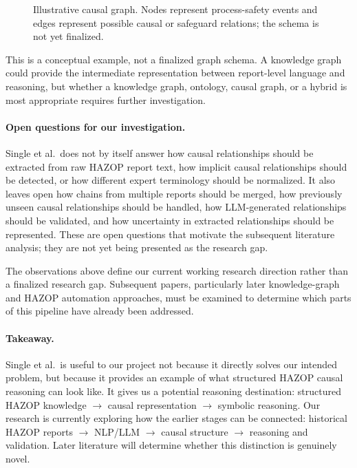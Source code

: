 \begin{figure}[htbp]
\centering
{}%
\caption[Conceptual causal graph for HAZOP reasoning]{Illustrative causal
graph. Nodes represent process-safety events and edges represent possible
causal or safeguard relations; the schema is not yet finalized.}
\label{fig:w2-conceptual-graph}
\end{figure}

This is a conceptual example, not a finalized graph schema. A knowledge graph
could provide the intermediate representation between report-level language
and reasoning, but whether a knowledge graph, ontology, causal graph, or a
hybrid is most appropriate requires further investigation.

\paragraph{Open questions for our investigation.}
Single et al.\ does not by itself answer how causal relationships should be
extracted from raw HAZOP report text, how implicit causal relationships should
be detected, or how different expert terminology should be normalized. It
also leaves open how chains from multiple reports should be merged, how
previously unseen causal relationships should be handled, how LLM-generated
relationships should be validated, and how uncertainty in extracted
relationships should be represented. These are open questions that motivate
the subsequent literature analysis; they are not yet being presented as the
research gap.

The observations above define our current working research direction rather
than a finalized research gap. Subsequent papers, particularly later
knowledge-graph and HAZOP automation approaches, must be examined to determine
which parts of this pipeline have already been addressed.

\paragraph{Takeaway.}
Single et al.\ is useful to our project not because it directly solves our
intended problem, but because it provides an example of what structured HAZOP
causal reasoning can look like. It gives us a potential reasoning destination:
structured HAZOP knowledge $\rightarrow$ causal representation $\rightarrow$
symbolic reasoning. Our research is currently exploring how the earlier
stages can be connected: historical HAZOP reports $\rightarrow$ NLP/LLM
$\rightarrow$ causal structure $\rightarrow$ reasoning and validation. Later
literature will determine whether this distinction is genuinely novel.

